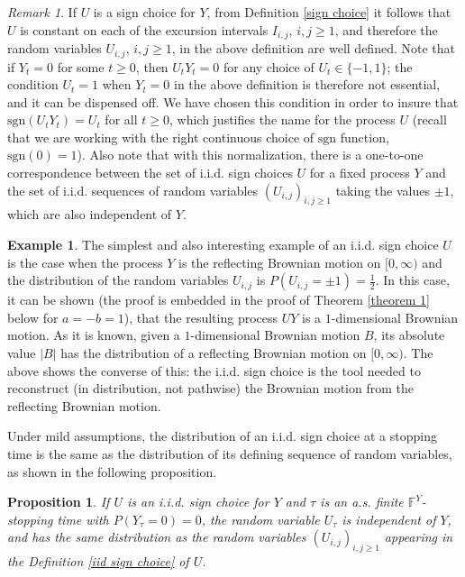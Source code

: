 \documentclass[reqno]{amsart}
\newtheorem{proposition}[theorem]{Proposition}
\theoremstyle{definition}
\newtheorem{example}[theorem]{Example}
\theoremstyle{remark}
\newtheorem{remark}[theorem]{Remark}
\numberwithin{equation}{section}
\begin{document}
\begin{remark} If $U$ is a sign choice for $Y$, from Definition \ref{sign choice} it follows that $U$ is constant on each of the excursion intervals $I_{i,j}$, $i,j\ge 1$, and therefore the random variables $U_{i,j}$, $i,j\ge 1$, in the above definition are well defined. Note that if $Y_t=0$ for some $t\ge 0$, then $U_t Y_t =0$ for any choice of $U_t \in \{-1,1\}$; the condition $U_t=1$ when $Y_t=0$ in the above definition is therefore not essential, and it can be dispensed off. We have chosen this condition in order to insure that $\mathrm{sgn}(U_t Y_t) =U_t$ for all $t\ge 0$, which justifies the name for the process $U$ (recall that we are working with the right continuous choice of $\mathrm{sgn}$ function, $\mathrm{sgn}(0)=1$). Also note that with this normalization, there is a one-to-one correspondence between the set of  i.i.d. sign choices $U$ for a fixed process $Y$ and the set of i.i.d. sequences of random variables $(U_{i,j})_{i,j\geq 1}$ taking the values $\pm 1$, which are also independent of $Y$.

\end{remark}

\begin{example}
The simplest and also interesting example of an i.i.d. sign choice $U$ is the case when the process $Y$ is the reflecting Brownian motion on $[0,\infty)$ and the distribution of the random variables $U_{i,j}$ is $P(U_{i,j}=\pm 1)=\frac12$. In this case, it can be shown (the proof is embedded in the proof of Theorem \ref{theorem 1} below for $a=-b=1$), that the resulting process $U Y$ is a $1$-dimensional Brownian motion.
As it is known, given a $1$-dimensional Brownian motion $B$, its absolute value $\vert B\vert$ has the distribution of a reflecting Brownian motion on $[0,\infty)$. The above shows the converse of this: the i.i.d. sign choice is the tool needed to reconstruct (in distribution, not pathwise) the Brownian motion from the reflecting Brownian motion.
\end{example}

Under mild assumptions, the distribution of an i.i.d. sign choice at a stopping time is the same as the distribution of its defining sequence of random variables, as shown in the following proposition.

\begin{proposition}\label{proposition on stopping times of iid sign choice}
If $U$ is an i.i.d. sign choice for $Y$ and $\tau$ is an a.s. finite $\mathbb{F}^Y$-stopping time with $P(Y_\tau=0)=0$, the random variable $U_\tau$ is independent of $Y$, and has the same distribution as the random variables $(U_{i,j})_{i,j\ge 1}$ appearing in the Definition \ref{iid sign choice} of $U$.
\end{proposition}
\end{document}
